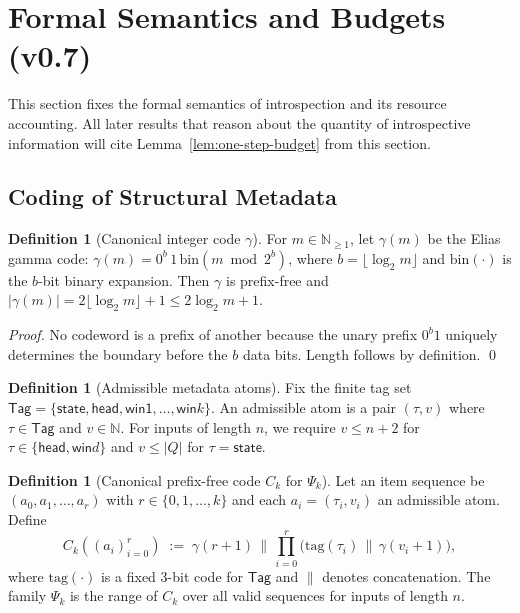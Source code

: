 \documentclass[11pt]{article}
\theoremstyle{definition}
\newtheorem{definition}[theorem]{Definition}
\newcommand{\PSi}{\Psi}
\begin{document}
\section{Formal Semantics and Budgets (v0.7)}

This section fixes the formal semantics of introspection and its resource accounting. All later results that reason about the quantity of introspective information will cite Lemma~\ref{lem:one-step-budget} from this section.

\subsection{Coding of Structural Metadata}

\begin{definition}[Canonical integer code $\gamma$]
\label{def:gamma}
For $m\in\mathbb{N}_{\ge1}$, let $\gamma(m)$ be the Elias gamma code: $\gamma(m)=0^{b}\,1\,\mathrm{bin}(m\bmod 2^{b})$, where $b=\lfloor\log_2 m\rfloor$ and $\mathrm{bin}(\cdot)$ is the $b$-bit binary expansion. Then $\gamma$ is prefix-free and $|\gamma(m)|=2\lfloor\log_2 m\rfloor+1\le 2\log_2 m + 1$.
\end{definition}

\begin{proof}
No codeword is a prefix of another because the unary prefix $0^{b}1$ uniquely determines the boundary before the $b$ data bits. Length follows by definition. \qed
\end{proof}

\begin{definition}[Admissible metadata atoms]
\label{def:atoms}
Fix the finite tag set $\mathsf{Tag}=\{\textsf{state},\textsf{head},\textsf{win1},\ldots,\textsf{win}k\}$. An admissible atom is a pair $(\tau, v)$ where $\tau\in\mathsf{Tag}$ and $v\in\mathbb{N}$. For inputs of length $n$, we require $v\le n+2$ for $\tau\in\{\textsf{head},\textsf{win}d\}$ and $v\le |Q|$ for $\tau=\textsf{state}$.
\end{definition}

\begin{definition}[Canonical prefix-free code $C_k$ for $\PSi_k$]
\label{def:psi-k}
Let an item sequence be $(a_0,a_1,\ldots,a_r)$ with $r\in\{0,1,\ldots,k\}$ and each $a_i=(\tau_i,v_i)$ an admissible atom. Define
\[
C_k((a_i)_{i=0}^r)\;:=\; \gamma(r+1)\,\big\|\,\prod_{i=0}^{r}\Big(\mathrm{tag}(\tau_i)\,\big\|\,\gamma(v_i+1)\Big),
\]
where $\mathrm{tag}(\cdot)$ is a fixed 3-bit code for $\mathsf{Tag}$ and $\|$ denotes concatenation. The family $\PSi_k$ is the range of $C_k$ over all valid sequences for inputs of length $n$.
\end{definition}
\end{document}
